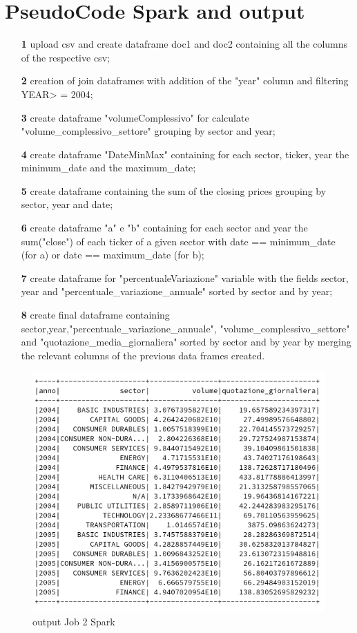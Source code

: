 \documentclass[]{report}
\begin{document}
\section*{PseudoCode Spark and output}
\begin{itemize}
	\item[\textbf{1}] upload csv and create dataframe doc1 and doc2 containing all the columns of the respective csv;
	\item[\textbf{2}]  creation of join dataframes with addition of the "year" column and filtering YEAR> = 2004;
	\item[\textbf{3}] create dataframe "volumeComplessivo" for calculate "volume\_complessivo\_settore" grouping by sector and year;
	\item[\textbf{4}] create dataframe "DateMinMax" containing for each sector, ticker, year the minimum\_date and the maximum\_date;
	\item[\textbf{5}] create dataframe containing the sum of the closing prices grouping by sector, year and date;
	\item[\textbf{6}] create dataframe "a" e "b" containing for each sector and year the sum("close") of each ticker of a given sector with date == minimum\_date (for a) or date == maximum\_date (for b);
	\item[\textbf{7}] create dataframe for "percentualeVariazione" variable with the fields sector, year and "percentuale\_variazione\_annuale" sorted by sector and by year;
	\item[\textbf{8}] create final dataframe containing sector,year,"percentuale\_variazione\_annuale", "volume\_complessivo\_settore" and "quotazione\_media\_giornaliera" sorted by sector and by year by merging the relevant columns of the previous data frames created.
\end{itemize}
\begin{center}
	\begin{figure}[!htb]
		\hspace{1.3 cm}
		\includegraphics[width=0.8 \linewidth]{figure/output2spark}
		\caption{output Job 2 Spark}
	\end{figure}
\end{center}
\end{document}
